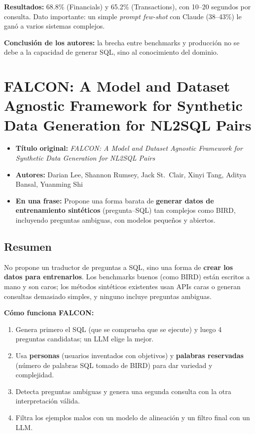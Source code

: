\documentclass[11pt,a4paper]{article}
\newcommand{\ficha}[5]{%
  \begin{itemize}[leftmargin=*, label={}]
    \item \textbf{Título original:} \textit{#1}
    \item \textbf{Autores:} #2
    \item \textbf{En una frase:} #5
  \end{itemize}
}
\begin{document}
\textbf{Resultados:} 68.8\% (Financials) y 65.2\% (Transactions), con 10--20 segundos por consulta. Dato importante: un simple \textit{prompt few-shot} con Claude (38--43\%) le ganó a varios sistemas complejos.

\textbf{Conclusión de los autores:} la brecha entre benchmarks y producción no se debe a la capacidad de generar SQL, sino al conocimiento del dominio.

\section{FALCON: A Model and Dataset Agnostic Framework for Synthetic Data Generation for NL2SQL Pairs}
\ficha
  {FALCON: A Model and Dataset Agnostic Framework for Synthetic Data Generation for NL2SQL Pairs}
  {Darian Lee, Shannon Rumsey, Jack St.\ Clair, Xinyi Tang, Aditya Bansal, Yuanming Shi}
  {University of California, Santa Cruz y Adobe}
  {arXiv:2610.03625 (preprint), octubre 2026}
  {Propone una forma barata de \textbf{generar datos de entrenamiento sintéticos} (pregunta--SQL) tan complejos como BIRD, incluyendo preguntas ambiguas, con modelos pequeños y abiertos.}

\subsection*{Resumen}
No propone un traductor de preguntas a SQL, sino una forma de \textbf{crear los datos para entrenarlos}. Los benchmarks buenos (como BIRD) están escritos a mano y son caros; los métodos sintéticos existentes usan APIs caras o generan consultas demasiado simples, y ninguno incluye preguntas ambiguas.

\textbf{Cómo funciona FALCON:}
\begin{enumerate}
  \item Genera primero el SQL (que se comprueba que se ejecute) y luego 4 preguntas candidatas; un LLM elige la mejor.
  \item Usa \textbf{personas} (usuarios inventados con objetivos) y \textbf{palabras reservadas} (número de palabras SQL tomado de BIRD) para dar variedad y complejidad.
  \item Detecta preguntas ambiguas y genera una segunda consulta con la otra interpretación válida.
  \item Filtra los ejemplos malos con un modelo de alineación y un filtro final con un LLM.
\end{enumerate}
\end{document}
